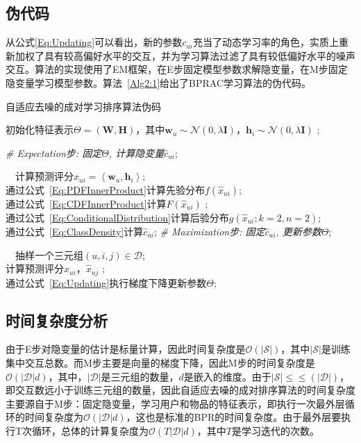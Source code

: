\subsection{伪代码}
从公式\eqref{Eq:Updating}可以看出，新的参数$c_{ui}$充当了动态学习率的角色，实质上重新加权了具有较高偏好水平的交互，并为学习算法过滤了具有较低偏好水平的噪声交互。算法的实现使用了EM框架，在E步固定模型参数求解隐变量，在M步固定隐变量学习模型参数。算法~\ref{Alg2:1}给出了BPRAC学习算法的伪代码。
\begin{algorithm}[t]
	\SetAlgoLined
	\small
	\caption{自适应去噪的成对学习排序算法伪码}\label{Alg2:1}
	初始化特征表示$\Theta =(\mathbf{W}, \mathbf{H})$，其中$\mathbf{w}_u \sim \mathcal{N}(0, \lambda \mathbf{I})$，$\mathbf{h}_i \sim \mathcal{N}(0, \lambda \mathbf{I})$ ;
	
	{
		\textit{\# Expectation步: 固定$\Theta$, 计算隐变量${{\hat c}_{ui}}$};
		
		{
			~~计算预测评分${{\hat x}_{ui}} = \left\langle   {{\mathbf{w}_u},{\mathbf{h}_i}} \right\rangle  $;\\
			通过公式~\eqref{Eq:PDFInnerProduct}计算先验分布$f({{\hat x}_{ui}})$;\\
			通过公式~\eqref{Eq:CDFInnerProduct}计算$F({{\hat x}_{ui}})$ ;\\
			通过公式~\eqref{Eq:ConditionalDistribution}计算后验分布$g({{\hat x}_{ui}};k=2,n=2)$;\\
			通过公式~\eqref{Eq:ClassDensity}计算${{\hat c}_{ui}}$;
		}
		\textit{\# Maximization步: 固定${{\hat c}_{ui}}$, 更新参数$\Theta$};
		
		{
			~~抽样一个三元组$(u,i,j) \in \mathcal{D}$;\\
			计算预测评分${{\hat x}_{ui}}$，${{\hat x}_{uj}}$ ;\\
			通过公式~\eqref{Eq:Updating}执行梯度下降更新参数$\Theta$;
		}
	}
\end{algorithm}

\subsection{时间复杂度分析}
由于E步对隐变量的估计是标量计算，因此时间复杂度是$\mathcal{O}(|\mathcal{S}|)$，其中$|\mathcal{S}|$是训练集中交互总数。而M步主要是向量的梯度下降，因此M步的时间复杂度是$\mathcal{O}(|\mathcal{D}|d)$，其中，$|\mathcal{D}|$是三元组的数量，$d$是嵌入的维度。由于$|\mathcal{S}| \le\le (|\mathcal{D}|)$，即交互数远小于训练三元组的数量，因此自适应去噪的成对排序算法的时间复杂度主要源自于M步：固定隐变量，学习用户和物品的特征表示，即执行一次最外层循环的时间复杂度为$\mathcal{O}(|\mathcal{D}|d)$，这也是标准的BPR的时间复杂度。由于最外层要执行T次循环，总体的计算复杂度为$\mathcal{O}(T|\mathcal{D}|d)$，其中$T$是学习迭代的次数。

